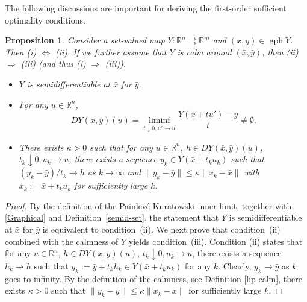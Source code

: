 \documentclass[11pt]{article}
\numberwithin{equation}{section}
\newtheorem{proposition}{Proposition}[section]
\begin{document}
{The following discussions are important for deriving the first-order sufficient optimality conditions. 
\begin{proposition}\label{prop2.1}
Consider  a set-valued map $Y: \mathbb{R}^n \rightrightarrows \mathbb{R}^m$ and $(\bar x,\bar y) \in  \operatorname{gph}Y$. Then (i) $\Leftrightarrow$ (ii). If we further assume that $Y$ is calm around $(\bar x,\bar y)$, then (ii) $\Rightarrow$ (iii) (and thus (i) $\Rightarrow$ (iii)).
\begin{itemize}
\item[(i)] $Y$ is semidifferentiable at $\bar x$ for $\bar y$.
\item[(ii)] For any $u \in \mathbb{R}^n$,
$$D Y(\bar x,\bar y)(u) =  \liminf_{t\downarrow 0,u' \to u} \frac{Y(\bar x+tu')-\bar y}{t} \neq \emptyset.$$
\item[(iii)] There exists $\kappa>0$ such that for any $u \in \mathbb{R}^n$, $h \in D Y(\bar x,\bar y)(u)$, $t_k \downarrow 0, u_k \to u$, there exists a sequence $y_k \in Y(\bar x+t_ku_k)$ such that $(y_k-\bar y)/t_k \to h$ as $k \to \infty$ and $\|y_k-\bar y\| \leq \kappa \|x_k-\bar x\|$ with $x_k:=\bar x+t_ku_k$ for sufficiently large $k$.
\end{itemize}
\end{proposition}
\begin{proof}
By the definition of the Painlevé-Kuratowski inner limit, together with \eqref{Graphical} and Definition~\ref{semid-set}, the statement that $Y$ is semidifferentiable at $\bar{x}$ for $\bar{y}$ is equivalent to condition~(ii).
We next prove that condition~(ii) combined with the calmness of $Y$ yields condition~(iii). Condition (ii) states that for any $u \in \mathbb{R}^n$, $h \in D Y(\bar x,\bar y)(u)$, $t_k \downarrow 0, u_k \to u$, there exists a sequence $h_k \to h$ such that $y_k:=\bar y+t_kh_k \in Y(\bar x+t_ku_k)$ for any $k$. Clearly, $y_k \to \bar y$ as $k$ goes to infinity. By the definition of the calmness, see Definition \ref{lip-calm}, there exists $\kappa>0$ such that $\|y_k-\bar y\| \leq \kappa \|x_k-\bar x\|$ for sufficiently large $k$.
\end{proof}

}
\end{document}
